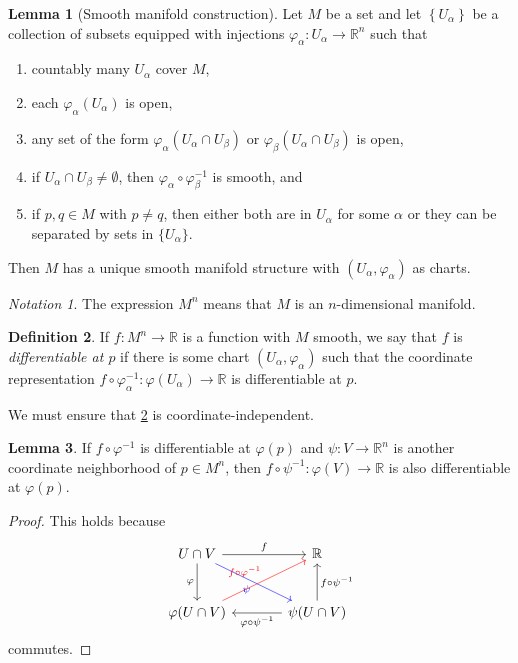 \documentclass[10pt,letterpaper,cm]{nupset}
\theoremstyle{definition}
\newtheorem{definition}{Definition}[subsection]
\theoremstyle{theorem}
\newtheorem{lemma}[definition]{Lemma}
\theoremstyle{remark}
\newtheorem*{notation}{Notation}
\newcommand{\R}{\mathbb R}
\newcommand{\1}{\mathbf{1}}
\newcommand{\0}{\vec 0}
\begin{document}
\begin{lemma}[Smooth manifold construction]\label{smc}
Let $M$ be a set and let $\left\{U_\alpha\right\}$ be a collection of subsets equipped with injections $\varphi_\alpha : U_\alpha \to \R^n$ such that
\begin{enumerate}[label=(\roman*)]
\item countably many $U_\alpha$ cover $M$,
\item each $\varphi_\alpha(U_\alpha)$ is open,
\item any set of the form $\varphi_\alpha(U_\alpha \cap U_\beta)$ or $\varphi_\beta(U_\alpha \cap U_\beta)$ is open,
\item if $U_\alpha \cap U_\beta \ne \emptyset$, then $\varphi_\alpha \circ \varphi_\beta^{-1}$ is smooth, 
and
\item if $p, q\in M$ with $p\ne q$, then either both are in $U_\alpha$ for some $\alpha$ or they can be separated by sets in $\{U_\alpha\}$.
\end{enumerate}

Then $M$ has a unique smooth manifold structure with $\left(U_\alpha, \varphi_\alpha\right)$ as charts. 
\end{lemma}

\smallskip

\begin{notation}
The expression $M^n$ means that $M$ is an $n$-dimensional manifold.
\end{notation}

\begin{definition}\label{d1}
If $f: M^n \to \R$ is a function with $M$ smooth, we say that $f$ is \textit{differentiable at $p$} if there is some chart $\left(U_\alpha, \varphi_\alpha\right)$ such that the coordinate representation $f\circ \varphi_\alpha^{-1}: \varphi(U_\alpha) \to \R$ is differentiable at $p$.
\end{definition}

We must ensure that \cref{d1} is coordinate-independent. 

\begin{lemma}
If $f \circ \varphi^{-1}$ is differentiable at $\varphi(p)$ and $\psi: V \to \R^n$ is another coordinate neighborhood of $p\in M^n$, then $f \circ \psi^{-1}: \varphi(V) \to \R$ is also differentiable at $\varphi(p)$.
\end{lemma}
\begin{proof}
This holds because
\[ \begin{tikzcd}[row sep=large, column sep=large]
U \cap V \arrow[to=Z, "\varphi", swap] \arrow[to=2-2, dr, blue, "\psi", swap]
& \R \\
|[alias=Z]| \varphi(U \cap V) \arrow[to=1-2, ur, red, "f\circ \varphi^{-1}"] 
& \psi(U \cap V)
\arrow[from=ul, to=1-2, "f"] \arrow[to=Z, "\varphi \circ \psi^{-1}"] \arrow[to=1-2, "f \circ \psi^{-1}", swap] 
\end{tikzcd}
\]
commutes.
\end{proof}
\end{document}
